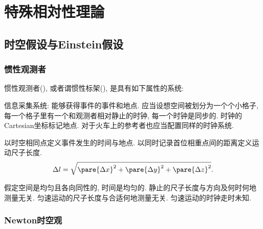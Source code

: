 \documentclass[hidelinks]{ctexart}
\begin{document}
\section{特殊相対性理論} %
\label{sec:特殊相対性理論}

\subsection{时空假设与Einstein假设} %
\label{sub:时空假设与einstein假设}

\subsubsection{惯性观测者} %
\label{ssub:惯性观测者}

惯性观测者(), 或者谓惯性标架(), 是具有如下属性的系统:
\begin{cenum}
    \item 信息采集系统: 能够获得事件的事件和地点. 应当设想空间被划分为一个个小格子, 每一个格子里有一个和观测者相对静止的时钟, 每一个时钟是同步的. 时钟的Cartesian坐标标记地点. 对于火车上的参考者也应当配置同样的时钟系统.
    \item 以时空相同点定义事件发生的时间与地点. 以同时记录首位相重点间的距离定义运动尺子长度.
    \[ \Delta l = \sqrt{\pare{\Delta x}^2 + \pare{\Delta y}^2 + \pare{\Delta z}^2}. \]
    \item 假定空间是均匀且各向同性的, 时间是均匀的. 静止的尺子长度与方向及何时何地测量无关. 匀速运动的尺子长度与合适何地测量无关. 匀速运动的时钟走时未知.
\end{cenum}


\subsubsection{Newton时空观} %
\label{ssub:newton时空观}
\end{document}
